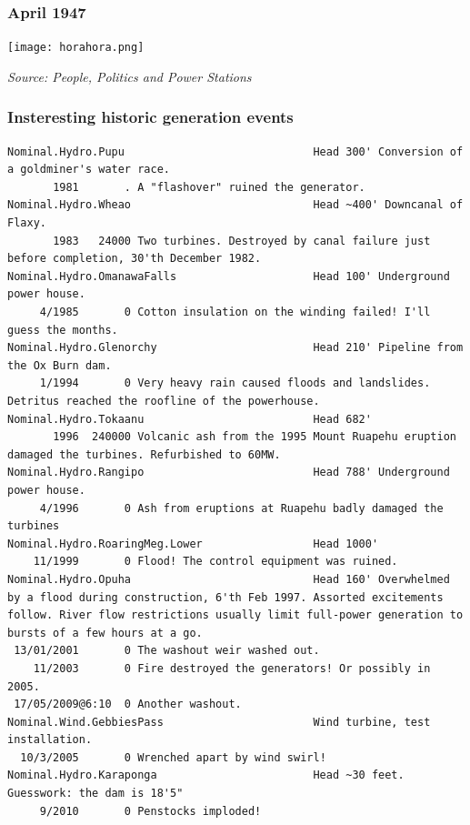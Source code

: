 \documentclass[aspectratio=169]{beamer}
\begin{document}
\frame
{\frametitle{April 1947}
\begin{center}
\texttt{[image: horahora.png]} 
\end{center}
\begin{flushright}
\tiny \emph{Source: People, Politics and Power Stations}
\end{flushright}

}


\begin{frame}[fragile]
  \frametitle{Insteresting historic generation events}
  \scriptsize
  \begin{verbatim}
Nominal.Hydro.Pupu                             Head 300' Conversion of a goldminer's water race.
       1981       . A "flashover" ruined the generator.
Nominal.Hydro.Wheao                            Head ~400' Downcanal of Flaxy.
       1983   24000 Two turbines. Destroyed by canal failure just before completion, 30'th December 1982.
Nominal.Hydro.OmanawaFalls                     Head 100' Underground power house.
     4/1985       0 Cotton insulation on the winding failed! I'll guess the months.
Nominal.Hydro.Glenorchy                        Head 210' Pipeline from the Ox Burn dam.
     1/1994       0 Very heavy rain caused floods and landslides. Detritus reached the roofline of the powerhouse.
Nominal.Hydro.Tokaanu                          Head 682'
       1996  240000 Volcanic ash from the 1995 Mount Ruapehu eruption damaged the turbines. Refurbished to 60MW.
Nominal.Hydro.Rangipo                          Head 788' Underground power house.
     4/1996       0 Ash from eruptions at Ruapehu badly damaged the turbines
Nominal.Hydro.RoaringMeg.Lower                 Head 1000'
    11/1999       0 Flood! The control equipment was ruined.
Nominal.Hydro.Opuha                            Head 160' Overwhelmed by a flood during construction, 6'th Feb 1997. Assorted excitements follow. River flow restrictions usually limit full-power generation to bursts of a few hours at a go.
 13/01/2001       0 The washout weir washed out.
    11/2003       0 Fire destroyed the generators! Or possibly in 2005.
 17/05/2009@6:10  0 Another washout.
Nominal.Wind.GebbiesPass                       Wind turbine, test installation.
  10/3/2005       0 Wrenched apart by wind swirl!
Nominal.Hydro.Karaponga                        Head ~30 feet. Guesswork: the dam is 18'5"
     9/2010       0 Penstocks imploded!

  \end{verbatim}
\end{frame}
\end{document}
